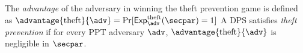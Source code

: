 

\begin{definition}\label{def:theft-prevention}
    The \emph{advantage} of the adversary in winning the theft prevention game is defined as
    $
        \advantage{\theftprevention}{\adv} = \Pr[\exper^{\theftprevention}_{\adv}(\secpar)=1]
    $
    A DPS satisfies \emph{theft prevention} if for every PPT adversary $\adv$, $\advantage{\theftprevention}{\adv}$ is negligible in $\secpar$.
\end{definition}
